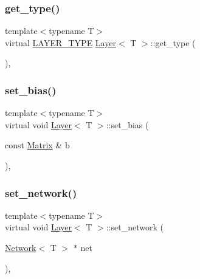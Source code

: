 \mbox{\label{class_layer_a9a59bb1bd6e1880abc71d9afbfb96496}} 
\subsubsection{\texorpdfstring{get\_type()}{get\_type()}}
{\footnotesize\ttfamily template$<$typename T$>$ \\
virtual \mbox{\hyperlink{layer__base_8hpp_a5f7e99058765b058df158c099200b154}{L\+A\+Y\+E\+R\+\_\+\+T\+Y\+PE}} \mbox{\hyperlink{class_layer}{Layer}}$<$ T $>$\+::get\+\_\+type (\begin{DoxyParamCaption}{ }\end{DoxyParamCaption})\hspace{0.3cm}{\ttfamily [inline]}, {\ttfamily [virtual]}}

\mbox{\label{class_layer_a16eecfdfbd98cb94918b7d19ecaeb740}} 
\subsubsection{\texorpdfstring{set\_bias()}{set\_bias()}}
{\footnotesize\ttfamily template$<$typename T$>$ \\
virtual void \mbox{\hyperlink{class_layer}{Layer}}$<$ T $>$\+::set\+\_\+bias (\begin{DoxyParamCaption}\item[{const \mbox{\hyperlink{class_layer_a22b1e7286096aa62bd245536c8ebdaf1}{Matrix}} \&}]{b }\end{DoxyParamCaption})\hspace{0.3cm}{\ttfamily [inline]}, {\ttfamily [virtual]}}

\mbox{\label{class_layer_a6281daa82294d6979eaa59acf0ea8f31}} 
\subsubsection{\texorpdfstring{set\_network()}{set\_network()}}
{\footnotesize\ttfamily template$<$typename T$>$ \\
virtual void \mbox{\hyperlink{class_layer}{Layer}}$<$ T $>$\+::set\+\_\+network (\begin{DoxyParamCaption}\item[{\mbox{\hyperlink{class_network}{Network}}$<$ T $>$ $\ast$}]{net }\end{DoxyParamCaption})\hspace{0.3cm}{\ttfamily [inline]}, {\ttfamily [virtual]}}


